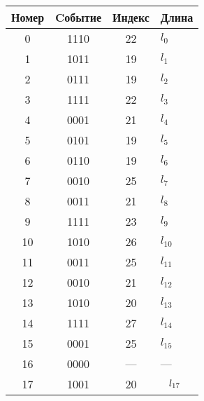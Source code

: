 \begin{multicols}{2}
\begin{center}
\vspace*{2ex}
{\small 
\tabcolsep=6pt
\begin{tabular}{|c|c|c|l|}
\hline
Номер&Cобытие&Индекс&\multicolumn{1}{c|}{Длина}\\
\hline
\hphantom{9}0&1110&22&\hspace*{3mm}$l_0$\\
\hphantom{9}1&1011&19&\hspace*{3mm}$l_1$\\
\hphantom{9}2&0111&19&\hspace*{3mm}$l_2$\\
\hphantom{9}3&1111&22&\hspace*{3mm}$l_3$\\
\hphantom{9}4&0001&21&\hspace*{3mm}$l_4$\\
\hphantom{9}5&0101&19&\hspace*{3mm}$l_5$\\
\hphantom{9}6&0110&19&\hspace*{3mm}$l_6$\\
\hphantom{9}7&0010&25&\hspace*{3mm}$l_7$\\
\hphantom{9}8&0011&21&\hspace*{3mm}$l_8$\\
\hphantom{9}9&1111&23&\hspace*{3mm}$l_9$\\
10&1010&26&\hspace*{3mm}$l_{10}$\\
11&0011&25&\hspace*{3mm}$l_{11}$\\
12&0010&21&\hspace*{3mm}$l_{12}$\\
13&1010&20&\hspace*{3mm}$l_{13}$\\
14&1111&27&\hspace*{3mm}$l_{14}$\\
15&0001&25&\hspace*{3mm}$l_{15}$\\
16&0000&---&\hspace*{3mm}---\\
17&1001&20&$\hspace*{3mm}l_{17}$\\
\hline
\end{tabular}
}
\end{center}


\end{multicols}
